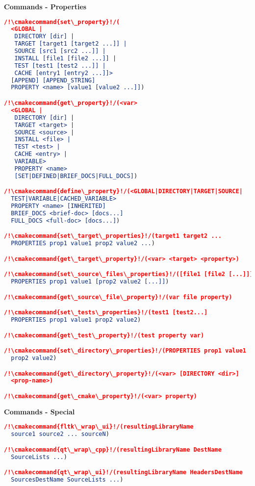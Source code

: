 \documentclass{article}
\newcommand{\cmakecommand}[1]{{\href{https://cmake.org/cmake/help/v3.20/command/#1.html}{#1}}}
\begin{document}
\begin{minipage}[t]{0.18\linewidth}
\textbf{Commands - Properties}
\begin{lstlisting}[language=CMake]
/!\cmakecommand{set\_property}!/(
  <GLOBAL |
   DIRECTORY [dir] |
   TARGET [target1 [target2 ...]] |
   SOURCE [src1 [src2 ...]] |
   INSTALL [file1 [file2 ...]] |
   TEST [test1 [test2 ...]] |
   CACHE [entry1 [entry2 ...]]>
  [APPEND] [APPEND_STRING]
  PROPERTY <name> [value1 [value2 ...]])

/!\cmakecommand{get\_property}!/(<var>
  <GLOBAL |
   DIRECTORY [dir] |
   TARGET <target> |
   SOURCE <source> |
   INSTALL <file> |
   TEST <test> |
   CACHE <entry> |
   VARIABLE>
   PROPERTY <name>
   [SET|DEFINED|BRIEF_DOCS|FULL_DOCS])

/!\cmakecommand{define\_property}!/(<GLOBAL|DIRECTORY|TARGET|SOURCE|
  TEST|VARIABLE|CACHED_VARIABLE>
  PROPERTY <name> [INHERITED]
  BRIEF_DOCS <brief-doc> [docs...]
  FULL_DOCS <full-doc> [docs...])

/!\cmakecommand{set\_target\_properties}!/(target1 target2 ...
  PROPERTIES prop1 value1 prop2 value2 ...)

/!\cmakecommand{get\_target\_property}!/(<var> <target> <property>)

/!\cmakecommand{set\_source\_files\_properties}!/([file1 [file2 [...]]]
  PROPERTIES prop1 value1 [prop2 value2 [...]])

/!\cmakecommand{get\_source\_file\_property}!/(var file property)

/!\cmakecommand{set\_tests\_properties}!/(test1 [test2...]
  PROPERTIES prop1 value1 prop2 value2)

/!\cmakecommand{get\_test\_property}!/(test property var)

/!\cmakecommand{set\_directory\_properties}!/(PROPERTIES prop1 value1
  prop2 value2)

/!\cmakecommand{get\_directory\_property}!/(<var> [DIRECTORY <dir>]
  <prop-name>)

/!\cmakecommand{get\_cmake\_property}!/(<var> property)
\end{lstlisting}

\textbf{Commands - Special}
\begin{lstlisting}[language=CMake]
/!\cmakecommand{fltk\_wrap\_ui}!/(resultingLibraryName
  source1 source2 ... sourceN)

/!\cmakecommand{qt\_wrap\_cpp}!/(resultingLibraryName DestName
  SourceLists ...)

/!\cmakecommand{qt\_wrap\_ui}!/(resultingLibraryName HeadersDestName
  SourcesDestName SourceLists ...)
\end{lstlisting}
\end{minipage}
\end{document}
